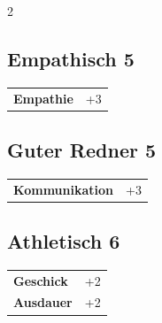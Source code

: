 \begin{multicols}{2}
\begin{tcolorbox}
\end{tcolorbox}

\begin{tcolorbox}
    \subsection*{Empathisch \hfill \small{5 }}
    \tcblower




\begin{tabular}{@{}ll@{}}
    \textbf{Empathie} & +3\\
\end{tabular}


\end{tcolorbox}

\begin{tcolorbox}
    \subsection*{Guter Redner \hfill \small{5 }}
    \tcblower




\begin{tabular}{@{}ll@{}}
    \textbf{Kommunikation} & +3\\
\end{tabular}


\end{tcolorbox}

\begin{tcolorbox}
    \subsection*{Athletisch \hfill \small{6 }}
    \tcblower




\begin{tabular}{@{}ll@{}}
    \textbf{Geschick} & +2\\
    \textbf{Ausdauer} & +2\\
\end{tabular}



\end{tcolorbox}
\end{multicols}

